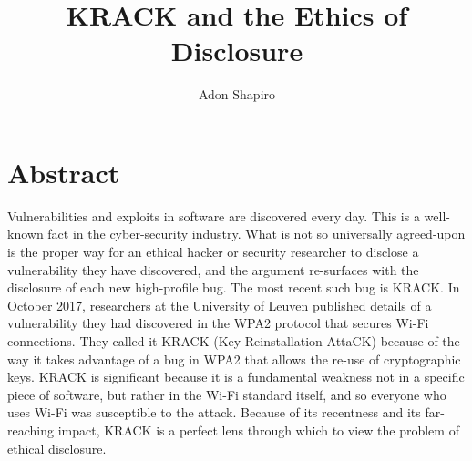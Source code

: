 \documentclass[12pt]{article}
\title{KRACK and the Ethics of Disclosure}
\author{Adon Shapiro}
\begin{document}
\maketitle
\section*{\hfil Abstract \hfil}
Vulnerabilities and exploits in software are discovered every day. This is a
well-known fact in the cyber-security industry. What is not so universally
agreed-upon is the proper way for an ethical hacker or security researcher to
disclose a vulnerability they have discovered, and the argument re-surfaces
with the disclosure of each new high-profile bug. The most recent such bug 
is KRACK.
In October 2017, researchers at the University of Leuven published details
of a vulnerability they had discovered in the WPA2 protocol that secures Wi-Fi
connections. They called it KRACK (Key Reinstallation AttaCK) because of the
way it takes advantage of a bug in WPA2 that allows the re-use of 
cryptographic keys. KRACK is significant because it is a fundamental weakness
not in a specific piece of software, but rather in the Wi-Fi standard itself,
and so everyone who uses Wi-Fi was susceptible to the attack. Because of its
recentness and its far-reaching impact, KRACK is a perfect lens through which
to view the problem of ethical disclosure.
\end{document}
